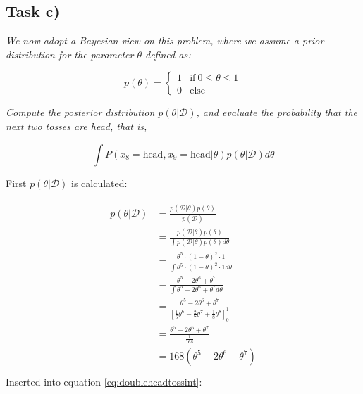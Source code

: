 \documentclass{article}
\begin{document}
\subsection*{Task c)}

\textit{We now adopt a Bayesian view on this problem, where we assume a prior distribution for the parameter $\theta$ defined as:}

\begin{equation}
p(\theta) = \left\{
\begin{array}{ll} 1 	& \text{if} ~ 0 \leq \theta \leq 1\\
  			 0	&  \text{else}
\end{array}\right.
\end{equation}

\textit{Compute the posterior distribution $p(\theta|\mathcal{D})$, and evaluate the probability that the next two tosses are head, that is,}

\begin{equation}\label{eq:doubleheadtossint}
\int P(x_8 = \text{head}, x_9 = \text{head} | \theta) p(\theta|\mathcal{D}) d\theta
\end{equation}

First  $p(\theta|\mathcal{D})$ is calculated:

\begin{align}
\begin{aligned}
p(\theta|\mathcal{D}) & = \frac{p(\mathcal{D}|\theta)p(\theta)}{p(\mathcal{D})}\\
				& = \frac{p(\mathcal{D}|\theta)p(\theta)}{\int p(\mathcal{D}|\theta)p(\theta)d\theta}\\
				& = \frac{\theta^5 \cdot (1 - \theta)^2 \cdot 1}{\int \theta^5 \cdot (1 - \theta)^2 \cdot 1 d\theta}\\
				& = \frac{\theta^5 - 2 \theta ^6 + \theta^7}{\int \theta^5 - 2 \theta ^6 + \theta^7 d\theta}\\
				& = \frac{\theta^5 - 2 \theta ^6 + \theta^7}{\left[\frac{1}{6}\theta^6 - \frac{2}{7} \theta ^7 + \frac{1}{8}\theta^8\right]_0^1}\\
				& = \frac{\theta^5 - 2 \theta ^6 + \theta^7}{\frac{1}{168}}\\
				& = 168(\theta^5 - 2 \theta ^6 + \theta^7)\\
\end{aligned}
\end{align}
\newpage
Inserted into equation \ref{eq:doubleheadtossint}:
\end{document}
